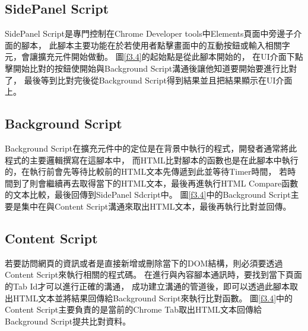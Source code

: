 \subsection{SidePanel Script}\label{s3.3.1}
SidePanel Script是專門控制在Chrome Developer tools中Elements頁面中旁邊子介面的腳本，
此腳本主要功能在於若使用者點擊畫面中的互動按鈕或輸入相關字元，會讓擴充元件開始做動。
圖\ref{f3.4}的起始點是從此腳本開始的，
在UI介面下點擊開始比對的按鈕使開始與Background Script溝通後讓他知道要開始要進行比對了，
最後等到比對完後從Background Script得到結果並且把結果顯示在UI介面上。

\subsection{Background Script}\label{s3.3.2}
Background Script在擴充元件中的定位是在背景中執行的程式，開發者通常將此程式的主要邏輯撰寫在這腳本中，
而HTML比對腳本的函數也是在此腳本中執行的，在執行前會先等待比較前的HTML文本先傳遞到此並等待Timer時間，
若時間到了則會繼續再去取得當下的HTML文本，最後再進執行HTML Compare函數的文本比較，最後回傳到SidePanel Sdcript中。
圖\ref{f3.4}中的Background Script主要是集中在與Content Script溝通來取出HTML文本，最後再執行比對並回傳。

\subsection{Content Script}\label{s3.3.3}
若要訪問網頁的資訊或者是直接新增或刪除當下的DOM結構，則必須要透過Content Script來執行相關的程式碼。
在進行與內容腳本通訊時，要找到當下頁面的Tab Id才可以進行正確的溝通，
成功建立溝通的管道後，即可以透過此腳本取出HTML文本並將結果回傳給Background Script來執行比對函數。
圖\ref{f3.4}中的Content Script主要負責的是當前的Chrome Tab取出HTML文本回傳給Background Script提共比對資料。

